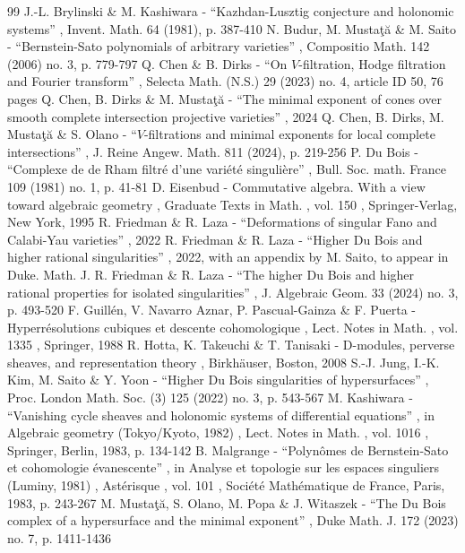\documentclass[11pt]{article}
\numberwithin{equation}{section}
\theoremstyle{plain}
\theoremstyle{definition}
\begin{document}
\begin{thebibliography}{99}
 J.-L. Brylinski \& M. Kashiwara - “Kazhdan-Lusztig conjecture and holonomic systems” , Invent. Math. 64 (1981), p. 387-410
 N. Budur, M. Mustaţă \& M. Saito - “Bernstein-Sato polynomials of arbitrary varieties” , Compositio Math. 142 (2006) no. 3, p. 779-797
 Q. Chen \& B. Dirks - “On $V$-filtration, Hodge filtration and Fourier transform” , Selecta Math. (N.S.) 29 (2023) no. 4, article ID 50, 76 pages
 Q. Chen, B. Dirks \& M. Mustaţă - “The minimal exponent of cones over smooth complete intersection projective varieties” , 2024
 Q. Chen, B. Dirks, M. Mustaţă \& S. Olano - “$V$-filtrations and minimal exponents for local complete intersections” , J. Reine Angew. Math. 811 (2024), p. 219-256
 P. Du Bois - “Complexe de de Rham filtré d’une variété singulière” , Bull. Soc. math. France 109 (1981) no. 1, p. 41-81
 D. Eisenbud - Commutative algebra. With a view toward algebraic geometry , Graduate Texts in Math. , vol. 150 , Springer-Verlag, New York, 1995
 R. Friedman \& R. Laza - “Deformations of singular Fano and Calabi-Yau varieties” , 2022
 R. Friedman \& R. Laza - “Higher Du Bois and higher rational singularities” , 2022, with an appendix by M. Saito, to appear in Duke. Math. J.
 R. Friedman \& R. Laza - “The higher Du Bois and higher rational properties for isolated singularities” , J. Algebraic Geom. 33 (2024) no. 3, p. 493-520
 F. Guillén, V. Navarro Aznar, P. Pascual-Gainza \& F. Puerta - Hyperrésolutions cubiques et descente cohomologique , Lect. Notes in Math. , vol. 1335 , Springer, 1988
 R. Hotta, K. Takeuchi \& T. Tanisaki - D-modules, perverse sheaves, and representation theory , Birkhäuser, Boston, 2008
 S.-J. Jung, I.-K. Kim, M. Saito \& Y. Yoon - “Higher Du Bois singularities of hypersurfaces” , Proc. London Math. Soc. (3) 125 (2022) no. 3, p. 543-567
 M. Kashiwara - “Vanishing cycle sheaves and holonomic systems of differential equations” , in Algebraic geometry (Tokyo/Kyoto, 1982) , Lect. Notes in Math. , vol. 1016 , Springer, Berlin, 1983, p. 134-142
 B. Malgrange - “Polynômes de Bernstein-Sato et cohomologie évanescente” , in Analyse et topologie sur les espaces singuliers (Luminy, 1981) , Astérisque , vol. 101 , Société Mathématique de France, Paris, 1983, p. 243-267
 M. Mustaţă, S. Olano, M. Popa \& J. Witaszek - “The Du Bois complex of a hypersurface and the minimal exponent” , Duke Math. J. 172 (2023) no. 7, p. 1411-1436

\end{thebibliography}
\end{document}
